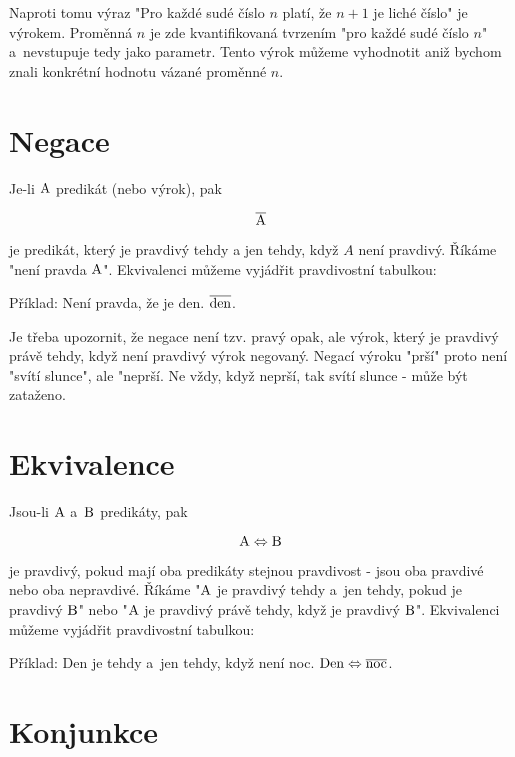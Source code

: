 Naproti tomu výraz "Pro každé sudé číslo \(n\) platí, že \(n + 1\) je liché číslo" je výrokem. Proměnná \(n\) je zde kvantifikovaná tvrzením "pro každé sudé číslo \(n\)" a~nevstupuje tedy jako parametr. Tento výrok můžeme vyhodnotit aniž bychom znali konkrétní hodnotu vázané proměnné \(n\).

\section{Negace}

Je-li \(\mathrm{A}\) predikát (nebo výrok), pak

\begin{equation}
\overline{\mathrm{A}} 
\end{equation}

je predikát, který je pravdivý tehdy a jen tehdy, když \(A\) není pravdivý. Říkáme "není pravda \(\mathrm{A}\)".
Ekvivalenci můžeme vyjádřit pravdivostní tabulkou:


Příklad: Není pravda, že je den. \(\overline{\mathrm{den}}\).

Je třeba upozornit, že negace není tzv. pravý opak, ale výrok, který je pravdivý právě tehdy, když není pravdivý výrok negovaný. Negací výroku "prší" proto není "svítí slunce", ale "neprší. Ne vždy, když neprší, tak svítí slunce - může být zataženo.

\section{Ekvivalence}

Jsou-li \(\mathrm{A}\) a~\(\mathrm{B}\) predikáty, pak

\begin{equation}
\mathrm{A} \Leftrightarrow \mathrm{B} 
\end{equation}

je pravdivý, pokud mají oba predikáty stejnou pravdivost - jsou oba pravdivé nebo oba nepravdivé. Říkáme "\(\mathrm{A}\) je pravdivý tehdy a~jen tehdy, pokud je pravdivý \(\mathrm{B}\)" nebo "\(\mathrm{A}\) je pravdivý právě tehdy, když je pravdivý \(\mathrm{B}\)".
Ekvivalenci můžeme vyjádřit pravdivostní tabulkou:


Příklad: Den je tehdy a~jen tehdy, když není noc. \(\mathrm{Den} \Leftrightarrow \overline{\mathrm{noc}}\).

\section{Konjunkce}

